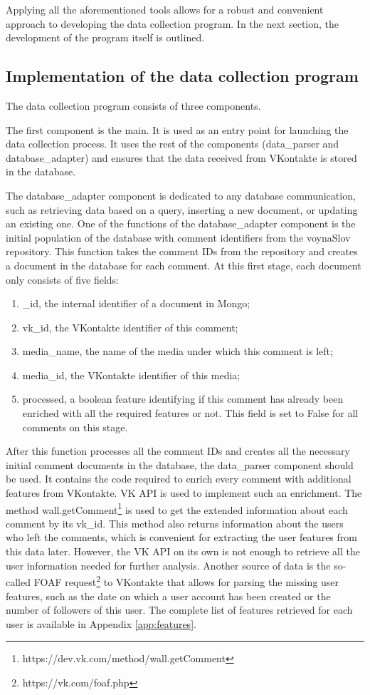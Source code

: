 Applying all the aforementioned tools allows for a robust and convenient approach to developing the data collection program. In the next section, the development of the program itself is outlined.

\subsection{Implementation of the data collection program}
The data collection program consists of three components.

The first component is the main. It is used as an entry point for launching the data collection process. It uses the rest of the components (data\_parser and database\_adapter) and ensures that the data received from VKontakte is stored in the database.

The database\_adapter component is dedicated to any database communication, such as retrieving data based on a query, inserting a new document, or updating an existing one. One of the functions of the database\_adapter component is the initial population of the database with comment identifiers from the voynaSlov repository. This function takes the comment IDs from the repository and creates a document in the database for each comment. At this first stage, each document only consists of five fields:
\begin{enumerate}
    \item \_id, the internal identifier of a document in Mongo;
    \item vk\_id, the VKontakte identifier of this comment;
    \item media\_name, the name of the media under which this comment is left;
    \item media\_id, the VKontakte identifier of this media;
    \item processed, a boolean feature identifying if this comment has already been enriched with all the required features or not. This field is set to False for all comments on this stage.
\end{enumerate}

After this function processes all the comment IDs and creates all the necessary initial comment documents in the database, the data\_parser component should be used. It contains the code required to enrich every comment with additional features from VKontakte. VK API is used to implement such an enrichment. The method wall.getComment\footnote{https://dev.vk.com/method/wall.getComment} is used to get the extended information about each comment by its vk\_id. This method also returns information about the users who left the comments, which is convenient for extracting the user features from this data later. However, the VK API on its own is not enough to retrieve all the user information needed for further analysis. Another source of data is the so-called FOAF request\footnote{https://vk.com/foaf.php} to VKontakte that allows for parsing the missing user features, such as the date on which a user account has been created or the number of followers of this user. The complete list of features retrieved for each user is available in Appendix \ref{app:features}.

